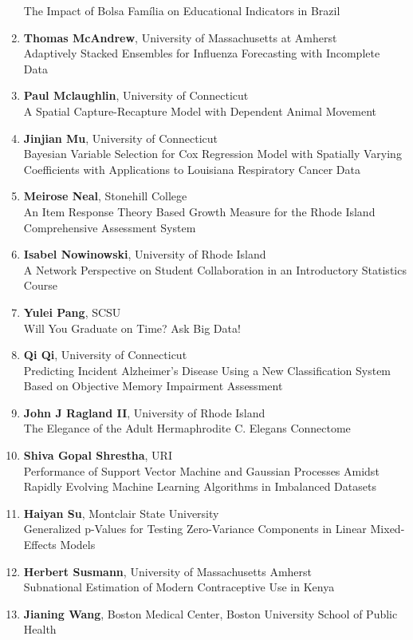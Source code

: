 \begin{enumerate}
The Impact of Bolsa Família on Educational Indicators in Brazil
\item \textbf{Thomas McAndrew}, University of Massachusetts at Amherst \\
Adaptively Stacked Ensembles for Influenza Forecasting with Incomplete Data
\item \textbf{Paul Mclaughlin}, University of Connecticut \\
A Spatial Capture-Recapture Model with Dependent Animal Movement
\item \textbf{Jinjian Mu}, University of Connecticut \\
Bayesian Variable Selection for Cox Regression Model with Spatially Varying Coefficients with Applications to Louisiana Respiratory Cancer Data
\item \textbf{Meirose Neal}, Stonehill College \\
An Item Response Theory Based Growth Measure for the Rhode Island Comprehensive Assessment System
\item \textbf{Isabel Nowinowski}, University of Rhode Island \\
A Network Perspective on Student Collaboration in an Introductory Statistics Course
\item \textbf{Yulei Pang}, SCSU \\
Will You Graduate on Time? Ask Big Data!
\item \textbf{Qi Qi}, University of Connecticut \\
Predicting Incident Alzheimer's Disease Using a New Classification System Based on Objective Memory Impairment Assessment
\item \textbf{John J Ragland II}, University of Rhode Island \\
The Elegance of the Adult Hermaphrodite C. Elegans Connectome
\item \textbf{Shiva Gopal Shrestha}, URI \\
Performance of Support Vector Machine  and Gaussian Processes Amidst Rapidly Evolving  Machine Learning Algorithms in Imbalanced Datasets
\item \textbf{Haiyan Su}, Montclair State University \\
Generalized p-Values for Testing Zero-Variance Components in Linear Mixed-Effects Models
\item \textbf{Herbert Susmann}, University of Massachusetts Amherst \\
Subnational Estimation of Modern Contraceptive Use in Kenya
\item \textbf{Jianing Wang}, Boston Medical Center, Boston University School of Public Health \\

\end{enumerate}

